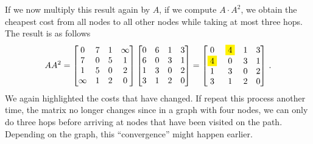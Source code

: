 If we now multiply this result again by $A$, \ie if we compute $A \cdot A^2$, we
obtain the cheapest cost from all nodes to all other nodes while taking at most
three hops. The result is as follows
\begin{equation*}
  AA^2 =
  \begin{bmatrix}    
    0 & 7 & 1 & \infty \\
    7 & 0 & 5 & 1 \\
    1 & 5 & 0 & 2 \\
    \infty & 1 & 2 & 0
  \end{bmatrix}
  \begin{bmatrix}    
    0 & {6} & 1 & {3} \\
    {6} & 0 & {3} & 1 \\
    1 & {3} & 0 & 2 \\
    {3} & 1 & 2 & 0
  \end{bmatrix}
  =
  \begin{bmatrix}    
    0 & \colorbox{yellow}{4} & 1 & {3} \\
    \colorbox{yellow}{4} & 0 & {3} & 1 \\
    1 & {3} & 0 & 2 \\
    {3} & 1 & 2 & 0
  \end{bmatrix}\,.
\end{equation*}
We again highlighted the costs that have changed. If repeat this process another
time, the matrix no longer changes since in a graph with four nodes, we can only
do three hops before arriving at nodes that have been visited on the
path. Depending on the graph, this ``convergence'' might happen earlier.

